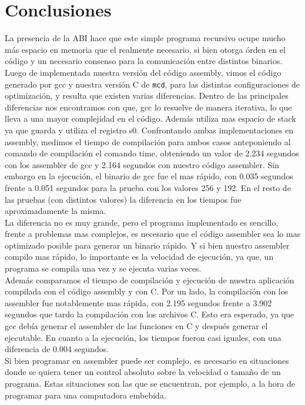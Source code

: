 \documentclass[a4paper,10pt]{article}
\def\code#1{\texttt{#1}}
\begin{document}
\section{Conclusiones}
    La presencia de la ABI hace que este simple programa recursivo ocupe mucho más espacio en memoria que el realmente necesario, si bien otorga órden en el código y un necesario consenso para la comunicación entre distintos binarios.\\
    Luego de implementada nuestra versión del código assembly, vimos el código generado por gcc y nuestra versión C de \code{mcd}, para las distintas configuraciones de optimización, y resulta que existen varias diferencias. Dentro de las principales diferencias nos encontramos con que, gcc lo resuelve de manera iterativa, lo que lleva a una mayor complejidad en el código. Además utiliza mas espacio de stack ya que guarda y utiliza el registro s0. Confrontando ambas implementaciones en assembly, medimos el tiempo de compilación para ambos casos anteponiendo al comando de compilación el comando time, obteniendo un valor de 2.234 segundos con los assembler de gcc y 2.164 segundos con nuestro código assembler. Sin embargo en la ejecución, el binario de gcc fue el mas rápido, con 0.035 segundos frente a 0.051 segundos para la prueba con los valores 256 y 192. En el resto de las pruebas (con distintos valores) la diferencia en los tiempos fue aproximadamente la misma.\\
    La diferencia no es muy grande, pero el programa implementado es sencillo, frente a problemas mas complejos, es necesario que el código assembler sea lo mas optimizado posible para generar un binario rápido. Y si bien nuestro assembler compilo mas rápido, lo importante es la velocidad de ejecución, ya que, un programa se compila una vez y se ejecuta varias veces.\\
    Además comparamos el tiempo de compilación y ejecución de nuestra aplicación compilada con el código assembly y con C. Por un lado, la compilación con los assembler fue notablemente mas rápida, con 2.195 segundos frente a 3.902 segundos que tardo la compilación con los archivos C. Esto era esperado, ya que gcc debía generar el assembler de las funciones en C y después generar el ejecutable. En cuanto a la ejecución, los tiempos fueron casi iguales, con una diferencia de 0.004 segundos.\\
    Si bien programar en assembler puede ser complejo, es necesario en situaciones donde se quiera tener un control absoluto sobre la velocidad o tamaño de un programa. Estas situaciones son las que se encuentran, por ejemplo, a la hora de programar para una computadora embebida.
\end{document}
